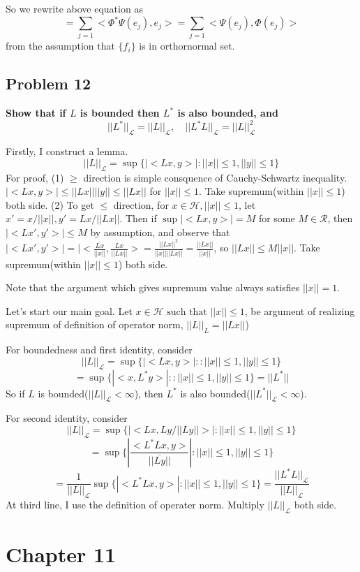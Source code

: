 \documentclass{article}
\begin{document}
So we rewrite above equation as
\[=\sum_{j=1} <\Phi^*\Psi(e_j),e_j>
=\sum_{j=1} <\Psi(e_j),\Phi(e_j)>\]
from the assumption that $\{f_i\}$ is in orthornormal set.




\subsection{Problem 12}
\textbf{
    Show that if $L$ is bounded then $L^*$ is also bounded, and
    \[||L^*||_{\mathcal{L}}=||L||_{\mathcal{L}}, \quad  
    ||L^*L||_{\mathcal{L}}=||L||^2_{\mathcal{L}}
    \]
}

Firstly, I construct a lemma.
\[||L||_{\mathcal{L}} = \sup\{|<Lx,y>|:||x||\leq 1, ||y||\leq 1\}\]
For proof, (1) $\geq$ direction is simple consquence of Cauchy-Schwartz inequality.
\(|<Lx,y>|\leq ||Lx||||y|| \leq ||Lx||\) for $||x||\leq 1$. Take supremum(within $||x||\leq 1$) both side.
(2) To get $\leq$ direction, for $x\in \mathcal{H}, ||x||\leq 1$,
let $x'=x/||x||, y'=Lx/||Lx||$. Then if $\sup|<Lx,y>|= M$ for some $M\in\mathcal{R}$, then $|<Lx',y'>|\leq M$ by assumption, and observe that
\(|<Lx',y'>|=|<\frac{Lx}{||x||},\frac{Lx}{||Lx||}>=\frac{||Lx||^2}{||x||||Lx||}=\frac{||Lx||}{||x||}\), so
$||Lx||\leq M||x||$. Take supremum(within $||x||\leq 1$) both side.

Note that the argument which gives supremum value always satisfies $||x||=1$.

Let's start our main goal.
Let $x\in \mathcal{H} \text{ such that } ||x||\leq 1$, be argument of realizing supremum of definition of operator norm, \(||L||_{L}=||Lx||\))

For boundedness and first identity, consider
\[||L||_\mathcal{{L}}=\sup\{|<Lx, y>| : :||x||\leq 1, ||y||\leq 1\}\]
\[=\sup\{|<x, L^*y>| : :||x||\leq 1, ||y||\leq 1\} = ||L^*||\]
So if $L$ is bounded($||L||_\mathcal{L}<\infty$), then $L^*$ is also bounded($||L^*||_\mathcal{L}<\infty$).

For second identity, consider
\[||L||_\mathcal{{L}}=\sup\{|<Lx, Ly/||Ly||>| :||x||\leq 1, ||y||\leq 1\}\]
\[=\sup\{|\frac{<L^*Lx, y>}{\overline{||Ly||}}| : ||x||\leq 1, ||y||\leq 1\}\]
\[=\frac{1}{||L||_{\mathcal{L}}}\sup\{|<L^*Lx, y>| : ||x||\leq 1, ||y||\leq 1\}=\frac{||L^*L||_{\mathcal{L}}}{||L||_{\mathcal{L}}}\]
At third line, I use the definition of operater norm. Multiply $||L||_{\mathcal{L}}$ both side.

\newpage
\section{Chapter 11}
\end{document}
